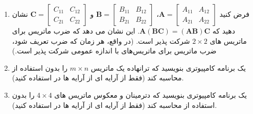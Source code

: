 {\begin{spacing}{1.5}
\begin{enumerate}[label=\textbf{\arabic*}.]
            \item {فرض کنید $\textbf{A}=\begin{bmatrix}
                                            A_{11} & A_{12} \\
                                            A_{21} & A_{22}
            \end{bmatrix}$، $\textbf{B}=\begin{bmatrix}
                                            B_{11} & B_{12} \\
                                            B_{21} & B_{22}
            \end{bmatrix}$ و $\textbf{C}=\begin{bmatrix}
                                             C_{11} & C_{12} \\
                                             C_{21} & C_{22}
            \end{bmatrix}$ نشان دهید که $\textbf{A}(\textbf{BC})=(\textbf{AB})\textbf{C}$.
            این نشان می دهد که ضرب ماتریس برای ماتریس های $2\times 2$ شرکت پذیر است.
                (در واقع، هر زمان که ضرب تعریف شود، ضرب ماتریس برای ماتریس‌های با اندازه عمومی شرکت پذیر است.)}

            \item {یک برنامه کامپیوتری بنویسید که ترانهاده یک ماتریس $m\times n$ را بدون استفاده از  محاسبه کند
                (فقط از آرایه ای از آرایه ها در  استفاده کنید).}

            \item {یک برنامه کامپیوتری بنویسید که دترمینان و معکوس ماتریس های $4\times 4$ را بدون استفاده از  محاسبه کند
                (فقط از آرایه ای از آرایه ها در  استفاده کنید).}
        \end{enumerate}
    \end{spacing}
}